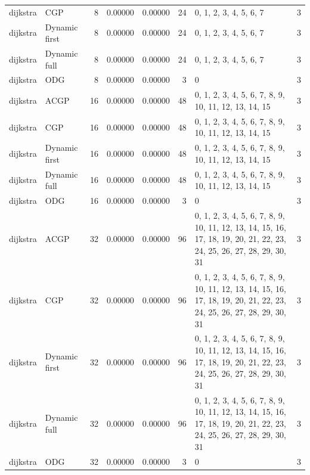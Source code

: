 \documentclass[10pt,a4paper]{article}
\begin{document}
\begin{longtable}{@{}p{23mm}p{29mm}rrrrp{36mm}r@{}}
dijkstra & CGP & 8 & 0.00000 & 0.00000 & 24 & 0, 1, 2, 3, 4, 5, 6, 7 & 3 \\
dijkstra & Dynamic first & 8 & 0.00000 & 0.00000 & 24 & 0, 1, 2, 3, 4, 5, 6, 7 & 3 \\
dijkstra & Dynamic full & 8 & 0.00000 & 0.00000 & 24 & 0, 1, 2, 3, 4, 5, 6, 7 & 3 \\
dijkstra & ODG & 8 & 0.00000 & 0.00000 & 3 & 0 & 3 \\
dijkstra & ACGP & 16 & 0.00000 & 0.00000 & 48 & 0, 1, 2, 3, 4, 5, 6, 7, 8, 9, 10, 11, 12, 13, 14, 15 & 3 \\
dijkstra & CGP & 16 & 0.00000 & 0.00000 & 48 & 0, 1, 2, 3, 4, 5, 6, 7, 8, 9, 10, 11, 12, 13, 14, 15 & 3 \\
dijkstra & Dynamic first & 16 & 0.00000 & 0.00000 & 48 & 0, 1, 2, 3, 4, 5, 6, 7, 8, 9, 10, 11, 12, 13, 14, 15 & 3 \\
dijkstra & Dynamic full & 16 & 0.00000 & 0.00000 & 48 & 0, 1, 2, 3, 4, 5, 6, 7, 8, 9, 10, 11, 12, 13, 14, 15 & 3 \\
dijkstra & ODG & 16 & 0.00000 & 0.00000 & 3 & 0 & 3 \\
dijkstra & ACGP & 32 & 0.00000 & 0.00000 & 96 & 0, 1, 2, 3, 4, 5, 6, 7, 8, 9, 10, 11, 12, 13, 14, 15, 16, 17, 18, 19, 20, 21, 22, 23, 24, 25, 26, 27, 28, 29, 30, 31 & 3 \\
dijkstra & CGP & 32 & 0.00000 & 0.00000 & 96 & 0, 1, 2, 3, 4, 5, 6, 7, 8, 9, 10, 11, 12, 13, 14, 15, 16, 17, 18, 19, 20, 21, 22, 23, 24, 25, 26, 27, 28, 29, 30, 31 & 3 \\
dijkstra & Dynamic first & 32 & 0.00000 & 0.00000 & 96 & 0, 1, 2, 3, 4, 5, 6, 7, 8, 9, 10, 11, 12, 13, 14, 15, 16, 17, 18, 19, 20, 21, 22, 23, 24, 25, 26, 27, 28, 29, 30, 31 & 3 \\
dijkstra & Dynamic full & 32 & 0.00000 & 0.00000 & 96 & 0, 1, 2, 3, 4, 5, 6, 7, 8, 9, 10, 11, 12, 13, 14, 15, 16, 17, 18, 19, 20, 21, 22, 23, 24, 25, 26, 27, 28, 29, 30, 31 & 3 \\
dijkstra & ODG & 32 & 0.00000 & 0.00000 & 3 & 0 & 3 \\
\end{longtable}\normalsize\setlength{\tabcolsep}{6pt}
\clearpage
\end{document}
